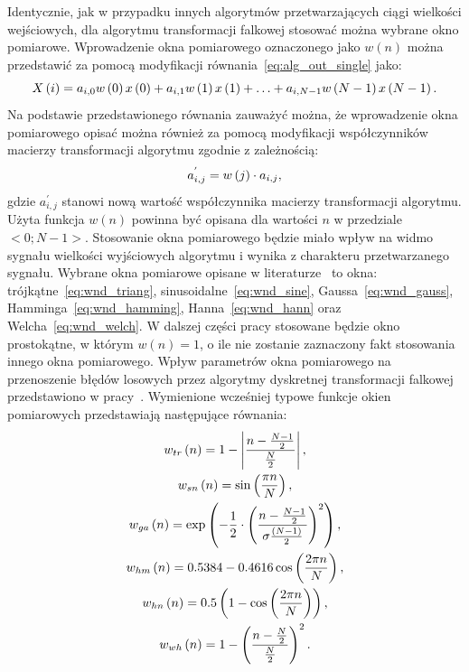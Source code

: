 Identycznie, jak w przypadku innych algorytmów przetwarzających ciągi wielkości wejściowych, dla algorytmu transformacji falkowej stosować można wybrane okno pomiarowe. Wprowadzenie okna pomiarowego oznaczonego jako $w(n)$ można przedstawić za pomocą modyfikacji równania~\eqref{eq:alg_out_single} jako:
\begin{equation}
X \left(i\right) = a_{i, 0} w \left(0\right) x \left(0\right) + a_{i, 1} w \left(1\right) x \left(1\right) + \hdots + a_{i, N-1} w \left(N-1\right) x \left(N-1\right) \label{eq:wt_singlewindow}.
\end{equation}
Na podstawie przedstawionego równania zauważyć można, że wprowadzenie okna pomiarowego opisać można również za pomocą modyfikacji współczynników macierzy transformacji algorytmu zgodnie z zależnością:
\begin{equation}
a_{i,j}^{'} = w \left(j\right) \cdot a_{i,j} \label{eq:wt_windowmod},
\end{equation}
gdzie $a_{i,j}^{'}$ stanowi nową wartość współczynnika macierzy transformacji algorytmu. Użyta funkcja $w(n)$ powinna być opisana dla wartości $n$ w przedziale $<0;N-1>$. Stosowanie okna pomiarowego będzie miało wpływ na widmo sygnału wielkości wyjściowych algorytmu i wynika z charakteru przetwarzanego sygnału. Wybrane okna pomiarowe opisane w literaturze~\cite{oppenheim_dsp, oppenheim_sns, proakis_dsp} to okna: trójkątne~\eqref{eq:wnd_triang}, sinusoidalne~\eqref{eq:wnd_sine}, Gaussa~\eqref{eq:wnd_gauss}, Hamminga~\eqref{eq:wnd_hamming}, Hanna~\eqref{eq:wnd_hann} oraz Welcha~\eqref{eq:wnd_welch}. W dalszej części pracy stosowane będzie okno prostokątne, w którym $w(n) = 1$, o ile nie zostanie zaznaczony fakt stosowania innego okna pomiarowego. Wpływ parametrów okna pomiarowego na przenoszenie błędów losowych przez algorytmy dyskretnej transformacji falkowej przedstawiono w pracy~\cite{auth_window}. Wymienione wcześniej typowe funkcje okien pomiarowych przedstawiają następujące równania:
\begin{gather}
w_{tr} \left(n\right) = 1 - \left| \frac{n - \frac{N-1}{2}}{\frac{N}{2}} \right| \label{eq:wnd_triang}, \\
w_{sn} \left(n\right) = \sin \left( \frac{\pi n}{N} \right) \label{eq:wnd_sine}, \\
w_{ga} \left(n\right) = \exp \left(-\frac{1}{2} \cdot \left( \frac{n - \frac{N-1}{2}}{\sigma \frac{\left(N-1\right)}{2}} \right)^{2} \right) \label{eq:wnd_gauss}, \\
w_{hm} \left(n\right) = 0.5384 - 0.4616 \cos \left( \frac{2 \pi n}{N} \right) \label{eq:wnd_hamming}, \\
w_{hn} \left(n\right) = 0.5 \left(1 - \cos \left( \frac{2 \pi n}{N} \right) \right) \label{eq:wnd_hann}, \\
w_{wh} \left(n\right) = 1 - \left( \frac{n - \frac{N}{2}}{\frac{N}{2}} \right)^{2} \label{eq:wnd_welch}.
\end{gather}

